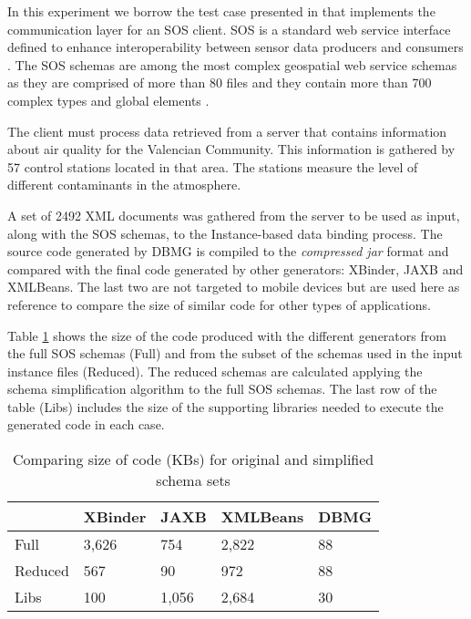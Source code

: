 \documentclass{sig-alternate}
\newcommand\T{\rule{0pt}{2.6ex}}
\newcommand\B{\rule[-1.2ex]{0pt}{0pt}}
\begin{document}
In this experiment we borrow the test case presented in \cite{proc:tamayo4} that implements the communication layer for an SOS client. SOS is a standard web service interface defined to enhance interoperability between sensor data producers and consumers \cite{ogc:sos}.  The SOS schemas are among the most complex geospatial web service schemas as they are comprised of more than 80 files and they contain more than 700 complex types and global elements \cite{proc:tamayo3} .

The client must process data retrieved  from a server that contains information about air quality for the Valencian Community. This information is gathered by  57 control stations located in that area. The stations measure the level of different contaminants in the atmosphere.

A set of 2492 XML documents was gathered from the server to be used as input, along with the SOS schemas, to the Instance-based data binding process. The source code generated by DBMG is compiled to the \textit{compressed jar} format and compared with the final code generated by other generators: XBinder, JAXB and XMLBeans. The last two are not targeted to mobile devices but are used here as reference to compare the size of similar code for other types of applications.

Table \ref{generatedcode2} shows the size of the code produced with the different generators from the full SOS schemas (Full) and from the subset of the schemas used in the input instance files (Reduced). The reduced schemas are calculated applying the schema simplification algorithm to the full SOS schemas. The last row of the table (Libs) includes the size of the supporting libraries needed to execute the generated code in each case. 

\begin{table}
\centering
\caption{Comparing size of code (KBs) for original and simplified schema sets}\label{generatedcode2}
\begin{tabular}{ |p{1.5cm}| p{1.1cm}| p{1cm}| p{1.6cm}| p{1cm}|} \hline
 \T \B &XBinder & JAXB & XMLBeans & DBMG\\ \hline
Full         & 3,626 &   754 & 2,822 & 88\\\hline
Reduced      &   567 &    90 &   972 & 88\\\hline
Libs 		 &   100 & 1,056 & 2,684 & 30\\\hline
\end{tabular}
\end{table}
\end{document}
